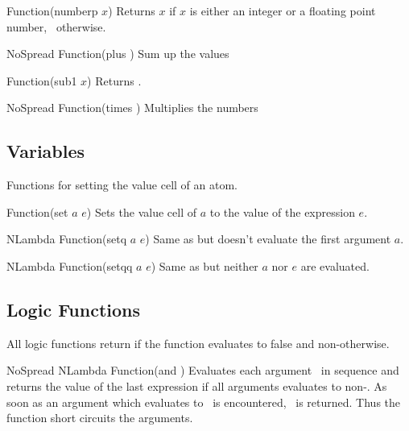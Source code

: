 \begin{defun}{Function}{(numberp $x$)}
  Returns $x$ if $x$ is either an integer or a floating point number,
  \NIL\ otherwise.
\end{defun}

\begin{defun}{NoSpread Function}{(plus \xargs)}
  Sum up the values \largs
\end{defun}

\begin{defun}{Function}{(sub1 $x$)}
  Returns .
\end{defun}

\begin{defun}{NoSpread Function}{(times \xargs)}
  Multiplies the numbers \largs
\end{defun}

\subsection{Variables}
Functions for setting the value cell of an atom.

\begin{defun}{Function}{(set $a$ $e$)}
  Sets the value cell of $a$ to the value of the expression $e$.
\end{defun}

\begin{defun}{NLambda Function}{(setq $a$ $e$)}
  Same as  but doesn't evaluate the first argument $a$.
\end{defun}

\begin{defun}{NLambda Function}{(setqq $a$ $e$)}
  Same as  but neither $a$ nor $e$ are evaluated.
\end{defun}

\subsection{Logic Functions}
All logic functions return \NIL if the function evaluates to false and
non-\NIL otherwise.

\begin{defun}{NoSpread NLambda Function}{(and \xargs)}
  Evaluates each argument \largs\ in sequence and returns the value of
  the last expression if all arguments evaluates to non-\NIL. As soon
  as an argument which evaluates to \NIL\ is encountered, \NIL\ is
  returned. Thus the function short circuits the arguments.
\end{defun}

